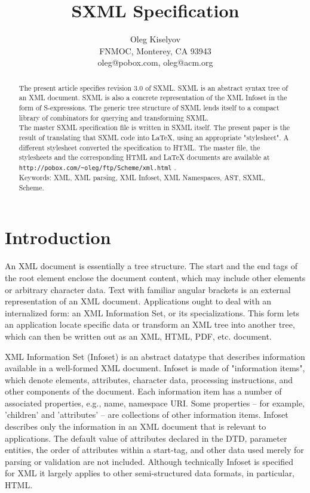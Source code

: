 \documentclass[10pt]{article}
\begin{document}
\title{SXML Specification}
\author{Oleg Kiselyov\\FNMOC, Monterey, CA 93943\\oleg@pobox.com, oleg@acm.org}
\maketitle
\begin{abstract}
The present article specifies revision 3.0 of SXML. SXML is an abstract syntax tree of an XML document. SXML is also
a concrete representation of the XML Infoset in the form of
S-expressions. The generic tree structure of SXML lends itself to a
compact library of combinators for querying and transforming SXML.\\The master SXML specification file is written in SXML itself. The present paper is the result of translating that SXML code into \LaTeX, using an appropriate "stylesheet". A different stylesheet converted the specification to HTML. The master file, the stylesheets and the corresponding HTML and \LaTeX{} documents are available at  \texttt{http://pobox.com/\textasciitilde{}oleg/ftp/Scheme/xml.html} .\\Keywords: XML, XML parsing, XML Infoset, XML Namespaces, AST, SXML, Scheme.\end{abstract}
\section{Introduction}
An XML document is essentially a tree structure. The start and the end
tags of the root element enclose the document content,
which may include other elements or arbitrary character data.  Text
with familiar angular brackets is an external representation of an XML
document. Applications ought to deal with an internalized form:
an XML Information Set, or its specializations.  This form lets an
application locate specific data or transform an XML tree into another
tree, which can then be written out as an XML, HTML, PDF, etc.
document.

XML Information Set (Infoset) \cite{XML Infoset} is an
abstract datatype that describes information available in a
well-formed XML document.  Infoset is made of "information items",
which denote elements, attributes, character data, processing
instructions, and other components of the document. Each information
item has a number of associated properties, e.g., name, namespace
URI. Some properties -- for example, 'children' and 'attributes' --
are collections of other information items. Infoset describes only the
information in an XML document that is relevant to applications. The
default value of attributes declared in the DTD, parameter entities,
the order of attributes within a start-tag, and other data used merely
for parsing or validation are not included. Although technically
Infoset is specified for XML it largely applies to other
semi-structured data formats, in particular, HTML.
\end{document}
